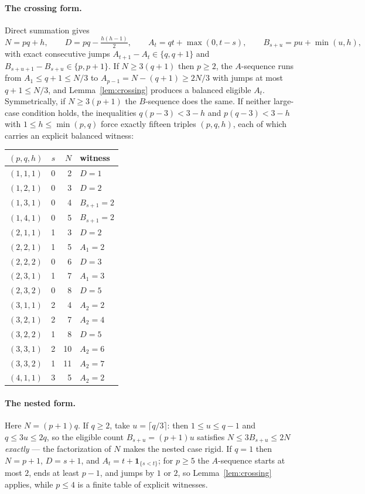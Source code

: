 \documentclass[11pt]{article}
\theoremstyle{definition}
\theoremstyle{remark}
\begin{document}
\paragraph{The crossing form.} Direct summation gives
\[
N=pq+h,\qquad D=pq-\tfrac{h(h-1)}{2},\qquad
A_t=qt+\max(0,t-s),\qquad B_{s+u}=pu+\min(u,h),
\]
with exact consecutive jumps $A_{t+1}-A_t\in\{q,q+1\}$ and
$B_{s+u+1}-B_{s+u}\in\{p,p+1\}$. If $N\ge 3(q+1)$ then $p\ge2$, the $A$-sequence runs
from $A_1\le q+1\le N/3$ to $A_{p-1}=N-(q+1)\ge 2N/3$ with jumps at most $q+1\le N/3$,
and Lemma~\ref{lem:crossing} produces a balanced eligible $A_t$. Symmetrically, if
$N\ge3(p+1)$ the $B$-sequence does the same. If neither large-case condition holds, the
inequalities $q(p-3)<3-h$ and $p(q-3)<3-h$ with $1\le h\le\min(p,q)$ force exactly fifteen
triples $(p,q,h)$, each of which carries an explicit balanced witness:

\begin{center}
\begin{tabular}{@{}lrrl@{}}\toprule
$(p,q,h)$ & $s$ & $N$ & witness \\ \midrule
$(1,1,1)$ & 0 & 2 & $D=1$\\
$(1,2,1)$ & 0 & 3 & $D=2$\\
$(1,3,1)$ & 0 & 4 & $B_{s+1}=2$\\
$(1,4,1)$ & 0 & 5 & $B_{s+1}=2$\\
$(2,1,1)$ & 1 & 3 & $D=2$\\
$(2,2,1)$ & 1 & 5 & $A_1=2$\\
$(2,2,2)$ & 0 & 6 & $D=3$\\
$(2,3,1)$ & 1 & 7 & $A_1=3$\\
$(2,3,2)$ & 0 & 8 & $D=5$\\
$(3,1,1)$ & 2 & 4 & $A_2=2$\\
$(3,2,1)$ & 2 & 7 & $A_2=4$\\
$(3,2,2)$ & 1 & 8 & $D=5$\\
$(3,3,1)$ & 2 & 10 & $A_2=6$\\
$(3,3,2)$ & 1 & 11 & $A_2=7$\\
$(4,1,1)$ & 3 & 5 & $A_2=2$\\ \bottomrule
\end{tabular}
\end{center}

\paragraph{The nested form.} Here $N=(p+1)q$. If $q\ge2$, take $u=\lceil q/3\rceil$: then
$1\le u\le q-1$ and $q\le 3u\le 2q$, so the eligible count $B_{s+u}=(p+1)u$ satisfies
$N\le 3B_{s+u}\le 2N$ \emph{exactly} --- the factorization of $N$ makes the nested case
rigid. If $q=1$ then $N=p+1$, $D=s+1$, and $A_t=t+\mathbf1_{\{s<t\}}$; for $p\ge5$ the
$A$-sequence starts at most $2$, ends at least $p-1$, and jumps by $1$ or $2$, so
Lemma~\ref{lem:crossing} applies, while $p\le4$ is a finite table of explicit witnesses.
\end{document}

